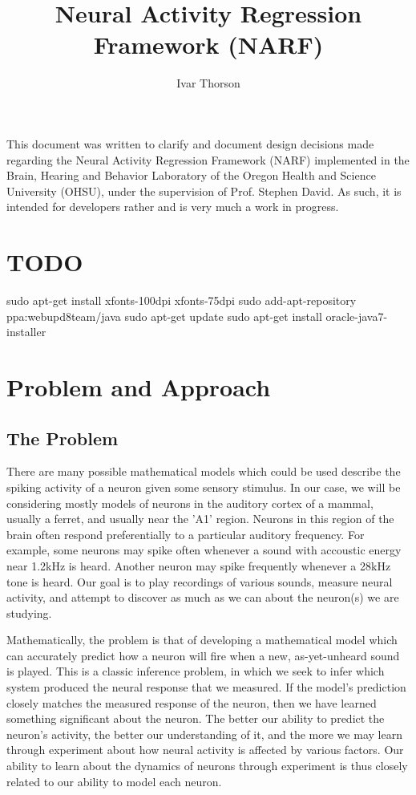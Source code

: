 \documentclass{article}
\title{Neural Activity Regression Framework (NARF)}
\author{Ivar Thorson}
\begin{document}
\maketitle

This document was written to clarify and document design decisions made regarding the Neural Activity Regression Framework (NARF) implemented in the Brain, Hearing and Behavior Laboratory of the Oregon Health and Science University (OHSU), under the supervision of Prof. Stephen David. As such, it is intended for developers rather and is very much a work in progress. 

\section{TODO}


sudo apt-get install xfonts-100dpi xfonts-75dpi
sudo add-apt-repository ppa:webupd8team/java
sudo apt-get update
sudo apt-get install oracle-java7-installer

\section{Problem and Approach}

\subsection{The Problem}

There are many possible mathematical models which could be used describe the spiking activity of a neuron given some sensory stimulus. In our case, we will be considering mostly models of neurons in the auditory cortex of a mammal, usually a ferret, and usually near the 'A1' region. Neurons in this region of the brain often respond preferentially to a particular auditory frequency. For example, some neurons may spike often whenever a sound with accoustic energy near 1.2kHz is heard. Another neuron may spike frequently whenever a 28kHz tone is heard. Our goal is to play recordings of various sounds, measure neural activity, and attempt to discover as much as we can about the neuron(s) we are studying.

Mathematically, the problem is that of developing a mathematical model which can accurately predict how a neuron will fire when a new, as-yet-unheard sound is played. This is a classic inference problem, in which we seek to infer which system produced the neural response that we measured. If the model's prediction closely matches the measured response of the neuron, then we have learned something significant about the neuron. The better our ability to predict the neuron's activity, the better our understanding of it, and the more we may learn through experiment about how neural activity is affected by various factors. Our ability to learn about the dynamics of neurons through experiment is thus closely related to our ability to model each neuron.
\end{document}
